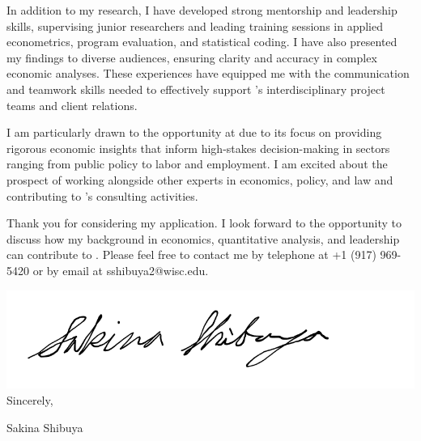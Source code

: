 \documentclass[12pt]{letter}
\begin{document}
In addition to my research, I have developed strong mentorship and leadership skills, supervising junior researchers and leading training sessions 
in applied econometrics, program evaluation, and statistical coding. I have also presented my findings to diverse audiences, ensuring clarity and accuracy 
in complex economic analyses. These experiences have equipped me with the communication and teamwork skills needed to effectively support 
\compName's interdisciplinary project teams and client relations.

I am particularly drawn to the opportunity at \compName \vspace{1mm} due to its focus on providing rigorous economic insights that inform high-stakes decision-making in 
sectors ranging from public policy to labor and employment. 
I am excited about the prospect of working alongside other experts in economics, policy, and law and 
contributing to \compName's consulting activities.

Thank you for considering my application. I look forward to the opportunity to discuss how my background in economics, quantitative analysis, and 
leadership can contribute to \compName. Please feel free to contact me by telephone at +1 (917) 969-5420 or by email at sshibuya2@wisc.edu.

\bigskip

\includegraphics[height=4\baselineskip]{signature.png}  \\

\vspace*{-6.5\baselineskip}Sincerely, 

\vspace{2.5\baselineskip}Sakina Shibuya
\end{document}

